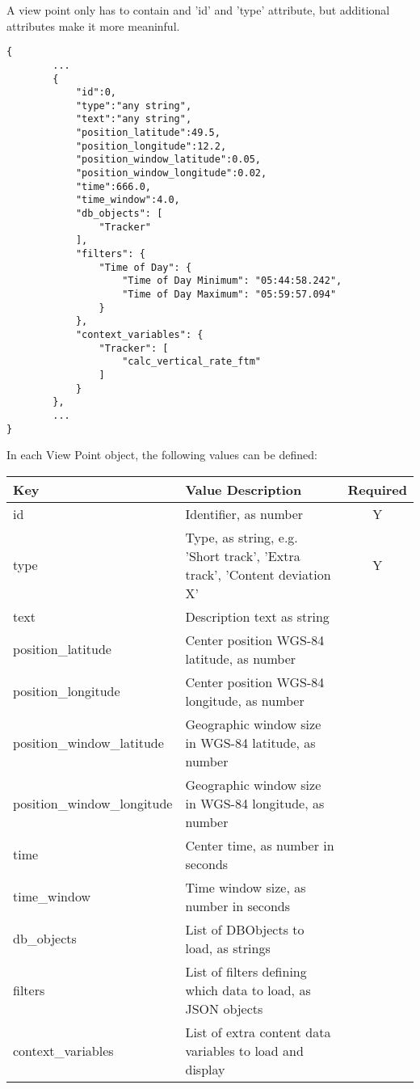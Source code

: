 A view point only has to contain and 'id' and 'type' attribute, but additional attributes make it more meaninful.

\begin{lstlisting}[basicstyle=\small\ttfamily]
{
        ...
        {
            "id":0,
            "type":"any string",
            "text":"any string",
            "position_latitude":49.5,
            "position_longitude":12.2,
            "position_window_latitude":0.05,
            "position_window_longitude":0.02,
            "time":666.0,
            "time_window":4.0,
            "db_objects": [
                "Tracker"
            ],
            "filters": {
                "Time of Day": {
                    "Time of Day Minimum": "05:44:58.242",
                    "Time of Day Maximum": "05:59:57.094"
                }
            },
            "context_variables": {
                "Tracker": [
                    "calc_vertical_rate_ftm"
                ]
            }
        },
        ...
}
\end{lstlisting}

In each View Point object, the following values can be defined:

\begin{center}
 \begin{table}[H]
  \begin{tabularx}{\textwidth}{ | l | X | c | }
    \hline
    \textbf{Key} & \textbf{Value Description} & \textbf{Required} \\ \hline
    id & Identifier, as number & Y \\ \hline
    type & Type, as string, e.g. 'Short track', 'Extra track', 'Content deviation X' & Y   \\ \hline
    text & Description text as string &    \\ \hline
    position\_latitude & Center position WGS-84 latitude, as number &    \\ \hline
    position\_longitude & Center position WGS-84 longitude, as number &    \\ \hline
    position\_window\_latitude & Geographic window size in WGS-84 latitude, as number &    \\ \hline
    position\_window\_longitude & Geographic window size in WGS-84 longitude, as number &    \\ \hline
    time & Center time, as number in seconds &    \\ \hline
    time\_window & Time window size, as number in seconds &    \\ \hline
    db\_objects & List of DBObjects to load, as strings &    \\ \hline
    filters & List of filters defining which data to load, as JSON objects &   \\ \hline
    context\_variables & List of extra content data variables to load and display &    \\ \hline
\end{tabularx}
\end{table}
\end{center}
\ \\

